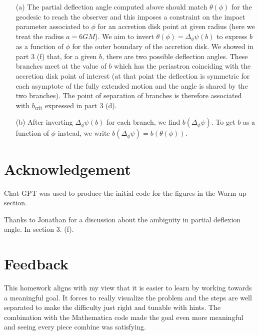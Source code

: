 \documentclass[10pt, a4paper]{article}
\begin{document}
\begin{enumerate}
  \item[(a)] The partial deflection angle computed above should match $\theta(\phi)$ for the geodesic to reach the observer and this imposes a constraint on the impact parameter associated to $\phi$ for an accretion disk point at given radius (here we treat the radius $a = 6GM$). We aim to invert  $\theta(\phi) = \Delta_{\phi} \psi(b)$ to express $b$ as a function of $\phi$ for the outer boundary of the accretion disk. We showed in part 3 (f) that, for a given $b$, there are two possible deflection angles. These branches meet at the value of $b$ which has the periastron coinciding with the accretion disk point of interest (at that point the deflection is symmetric for each asymptote of the fully extended motion and the angle is shared by the two branches). The point of separation of branches is therefore associated with $b_{\text{crit}}$ expressed in part 3 (d). 
  \item[(b)] After inverting $\Delta_{\phi} \psi(b)$ for each branch, we find $b(\Delta_{\phi} \psi)$. To get $b$ as a function of $\phi$ instead, we write $b(\Delta_{\phi} \psi) = b(\theta(\phi))$. 
\end{enumerate}


\section{Acknowledgement}

Chat GPT was used to produce the initial code for the figures in the Warm up section.

Thanks to Jonathan for a discussion about the ambiguity in partial deflexion angle. In section 3. (f).
\section{Feedback}

This homework aligns with my view that it is easier to learn by working towards a meaningful goal. It forces to really visualize the problem and the steps are well separated to make the difficulty just right and tunable with hints. The combination with the Mathematica code made the goal even more meaningful and seeing every piece combine was satisfying. 

\makereferences


\end{document}

